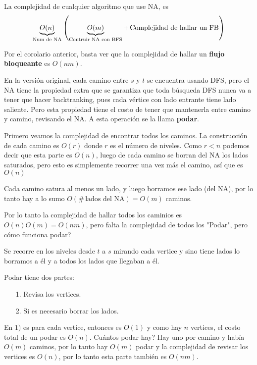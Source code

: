 \documentclass[12pt,a4paper]{article}
\begin{document}
\begin{corolario} La complejidad de cualquier algoritmo que use NA, es 
    $$\underbrace{O(n)}_{\text{Num de NA}}\left(\underbrace{O(m)}_{\text{Contruir NA con BFS}} + \,\text{Complejidad de hallar un FB}\right)$$
    \label{cor:NA}
\end{corolario}

Por el corolario anterior, basta ver que la complejidad de hallar un 
\textbf{flujo bloqueante} es $O(nm)$.
\medskip

En la versión original, cada camino entre $s$ y $t$ se encuentra usando DFS, 
pero el NA tiene la propiedad extra que se garantiza que toda búsqueda DFS nunca 
va a tener que hacer backtranking, pues cada vértice con lado entrante tiene lado 
saliente. Pero esta propiedad tiene el costo de tener que mantenerla entre 
camino y camino, revisando el NA. A esta operación se la llama \textbf{podar}.
\medskip

Primero veamos la complejidad de encontrar todos los caminos. La construcción de 
cada camino es $O(r)$ donde $r$ es el número de niveles. Como $r<n$ podemos decir 
que esta parte es $O(n)$, luego de cada camino se borran del NA los lados 
saturados, pero esto es simplemente recorrer una vez más el camino, así que 
es $O(n)$
\medskip

Cada camino satura al menos un lado, y luego borramos ese lado (del NA), por lo 
tanto hay a lo sumo $O(\# \,\text{lados del NA}) = O(m)$ caminos.
\medskip

Por lo tanto la complejidad de hallar todos los caminios es $O(n)O(m) = O(nm)$, 
pero falta la complejidad de todos los "Podar", pero cómo funciona podar?
\medskip

Se recorre en los niveles desde $t$ a $s$ mirando cada vertice y sino tiene lados 
lo borramos a él y a todos los lados que llegaban a él.
\medskip

Podar tiene dos partes:
\begin{itemize}
    \item [1.] Revisa los vertices.
    \item [2.] Si es necesario borrar los lados.
\end{itemize}

En $1)$ es para cada vertice, entonces es $O(1)$ y como hay $n$ vertices, el costo 
total de un podar es $O(n)$. Cuántos podar hay? Hay uno por camino y había $O(m)$ 
caminos, por lo tanto hay $O(m)$ podar y la complejidad de revisar los vertices 
es $O(n)$, por lo tanto esta parte también es $O(nm)$.
\medskip
\end{document}
